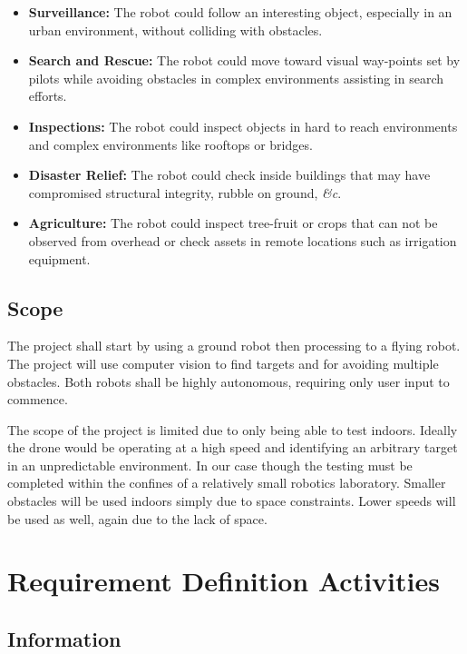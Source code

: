 \documentclass{article}
\begin{document}
		\begin{itemize}
			\item \textbf{Surveillance:} The robot could follow an interesting object, especially in an urban environment, without colliding with obstacles.
			\item \textbf{Search and Rescue:} The robot could move toward visual way-points set by pilots while avoiding obstacles in complex environments assisting in search efforts.
			\item \textbf{Inspections:} The robot could inspect objects in hard to reach environments and complex environments like rooftops or bridges.
			\item \textbf{Disaster Relief:} The robot could check inside buildings that may have compromised structural integrity, rubble on ground, \textit{\&c}.
			\item \textbf{Agriculture:} The robot could inspect tree-fruit or crops that can not be observed from overhead or check assets in remote locations such as irrigation equipment.
		\end{itemize}
		
	\subsection{Scope}
	
	The project shall start by using a ground robot then processing to a flying robot. The project will use computer vision to find targets and for avoiding multiple obstacles. Both robots shall be highly autonomous, requiring only user input to commence. 

	The scope of the project is limited due to only being able to test indoors. Ideally the drone would be operating at a high speed and identifying an arbitrary target in an unpredictable environment. In our case though the testing must be completed within the confines of a relatively small robotics laboratory. Smaller obstacles will be used indoors simply due to space constraints. Lower speeds will be used as well, again due to the lack of space. 

\section{Requirement Definition Activities}

	\subsection{Information}
	
\end{document}
